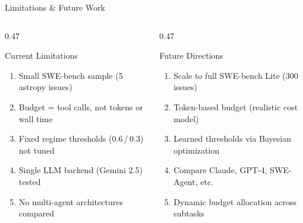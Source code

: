 \documentclass[aspectratio=169, 12pt]{beamer}
\begin{document}
\begin{frame}{Limitations \& Future Work}

\begin{columns}[T]
  \begin{column}{0.47\textwidth}
    \begin{alertedblock}{Current Limitations}
      {\footnotesize
        \begin{enumerate}
          \item Small SWE-bench sample (5 astropy issues)
          \item Budget = tool calls, not tokens or wall time
          \item Fixed regime thresholds (0.6\,/\,0.3) not tuned
          \item Single LLM backend (Gemini 2.5) tested
          \item No multi-agent architectures compared
        \end{enumerate}
      }
    \end{alertedblock}
  \end{column}
  \begin{column}{0.47\textwidth}
    \begin{exampleblock}{Future Directions}
      {\footnotesize
        \begin{enumerate}
          \item Scale to full SWE-bench Lite (300 issues)
          \item Token-based budget (realistic cost model)
          \item Learned thresholds via Bayesian optimization
          \item Compare Claude, GPT-4, SWE-Agent, etc.
          \item Dynamic budget allocation across subtasks
        \end{enumerate}
      }
    \end{exampleblock}
  \end{column}
\end{columns}

\end{frame}
\end{document}
